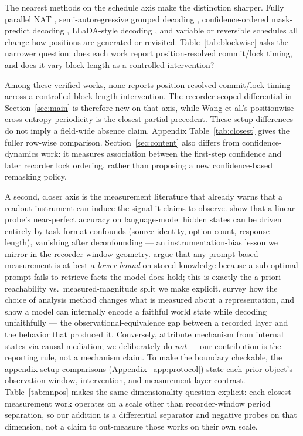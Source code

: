 \documentclass{article}
\begin{document}
The nearest methods on the schedule axis make the distinction sharper. Fully
parallel NAT \citep{gu2018nonautoregressive}, semi-autoregressive grouped decoding
\citep{wang2018semi}, confidence-ordered mask-predict decoding
\citep{ghazvininejad2019maskpredict}, LLaDA-style decoding
\citep{nie2025large,nie2026improved}, and variable or reversible schedules
\citep{li2025beyond,sun2026dystruct,wang2026reversible} all change how positions
are generated or revisited. Table~\ref{tab:blockwise} asks the narrower question:
does each work report position-resolved commit/lock timing, and does it vary block
length as a controlled intervention?

Among these verified works, none reports position-resolved commit/lock timing
across a controlled block-length intervention. The recorder-scoped differential
in Section~\ref{sec:main} is therefore new on that axis, while Wang et al.'s
positionwise cross-entropy periodicity is the closest partial precedent. These
setup differences do not imply a field-wide absence claim. Appendix
Table~\ref{tab:closest} gives the fuller row-wise comparison. Section~\ref{sec:content}
also differs from confidence-dynamics work: it measures association between the
first-step confidence and later recorder lock ordering, rather than proposing a
new confidence-based remasking policy.

A second, closer axis is the measurement literature that already warns that a
readout instrument can induce the signal it claims to observe. \citet{sahoo2026linearprobes}
show that a linear probe's near-perfect accuracy on language-model hidden states
can be driven entirely by task-format confounds (source identity, option count,
response length), vanishing after deconfounding --- an instrumentation-bias lesson
we mirror in the recorder-window geometry. \citet{jiang2020know} argue that any
prompt-based measurement is at best a \emph{lower bound} on stored knowledge
because a sub-optimal prompt fails to retrieve facts the model does hold; this is
exactly the a-priori-reachability vs.\ measured-magnitude split we make explicit.
\citet{belinkov2018analysis} survey how the choice of analysis method changes what
is measured about a representation, and \citet{feng2024monitoring} show a model
can internally encode a faithful world state while decoding unfaithfully --- the
observational-equivalence gap between a recorded layer and the behavior that
produced it. Conversely, \citet{stolfo2023mechanistic} attribute mechanism from
internal states via causal mediation; we deliberately do \emph{not} --- our
contribution is the reporting rule, not a mechanism claim. To make the boundary
checkable, the appendix setup comparisons (Appendix~\ref{app:protocol}) state
each prior object's observation window, intervention, and measurement-layer
contrast.
Table~\ref{tab:nnpos} makes the same-dimensionality question explicit: each
closest measurement work operates on a scale other than recorder-window period
separation, so our addition is a differential separator and negative probes on
that dimension, not a claim to out-measure those works on their own scale.
\end{document}
